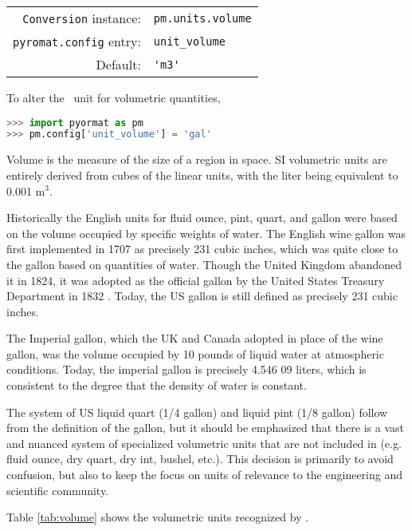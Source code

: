 \begin{tabular}{rl}
\hline
\verb|Conversion| instance: & \verb|pm.units.volume|\\
\verb|pyromat.config| entry: & \verb|unit_volume|\\
Default: & \verb|'m3'|\\
\hline
\end{tabular}
\vspace{1em}

To alter the \PM\ unit for volumetric quantities,
\begin{lstlisting}[language=Python]
>>> import pyormat as pm
>>> pm.config['unit_volume'] = 'gal'
\end{lstlisting}

Volume is the measure of the size of a region in space.  SI volumetric units are entirely derived from cubes of the linear units, with the liter being equivalent to 0.001 m$^3$.

Historically the English units for fluid ounce, pint, quart, and gallon were based on the volume occupied by specific weights of water.  The English wine gallon was first implemented in 1707 as precisely 231 cubic inches, which was quite close to the gallon based on quantities of water.  Though the United Kingdom abandoned it in 1824, it was adopted as the official gallon by the United States Treasury Department in 1832 \cite{nbs:sp447}.  Today, the US gallon is still defined as precisely 231 cubic inches.

The Imperial gallon, which the UK and Canada adopted in place of the wine gallon, was the volume occupied by 10 pounds of liquid water at atmospheric conditions.  Today, the imperial gallon is precisely 4.546 09 liters, which is consistent to the degree that the density of water is constant.

The system of US liquid quart (1/4 gallon) and liquid pint (1/8 gallon) follow from the definition of the gallon, but it should be emphasized that there is a vast and nuanced system of specialized volumetric units that are not included in \PM (e.g. fluid ounce, dry quart, dry int, bushel, etc.).  This decision is primarily to avoid confusion, but also to keep the focus on units of relevance to the engineering and scientific community.

Table \ref{tab:volume} shows the volumetric units recognized by \PM .

